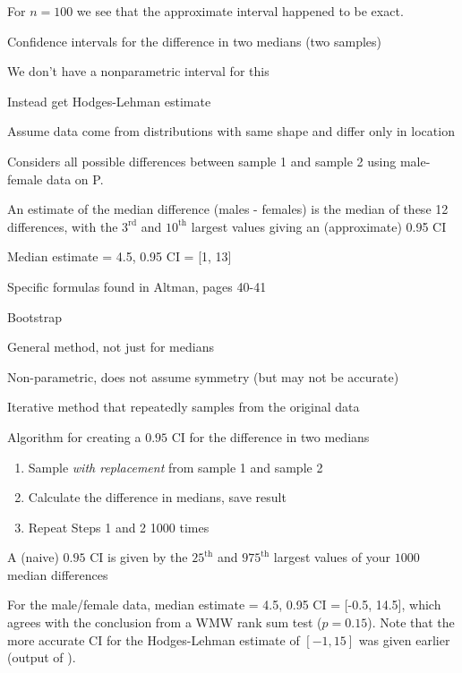 For $n=100$ we see that the approximate interval happened to be exact.
\ei
\item Confidence intervals for the difference in two medians (two samples)
\bi
\item We don't have a nonparametric interval for this
\item Instead get Hodges-Lehman estimate
\item Assume data come from distributions with same shape and differ only in location
\item Considers all possible differences between sample 1 and sample 2
  using male-female data on P.~\pageref{pg:nonpar-mf}
\item An estimate of the median difference (males - females) is the median of these 12 differences, with the $3^\textrm{rd}$ and $10^\textrm{th}$ largest values giving an (approximate) 0.95 CI
\item Median estimate = 4.5, 0.95 CI = [1, 13]
\item Specific formulas found in Altman, pages 40-41
\ei
\item Bootstrap 
\bi
\item General method, not just for medians
\item Non-parametric, does not assume symmetry (but may not be accurate)
\item Iterative method that repeatedly samples from the original data
\item Algorithm for creating a $0.95$ CI for the difference in two medians
\begin{enumerate}
\item Sample \textit{with replacement} from sample 1 and sample 2
\item Calculate the difference in medians, save result
\item Repeat Steps 1 and 2 1000 times
\end{enumerate}
\item A (naive) $0.95$ CI is given by the $25^\textrm{th}$ and $975^\textrm{th}$ largest values of your $1000$ median differences
\item For the male/female data, median estimate = 4.5, 0.95 CI = [-0.5, 14.5], which agrees with the conclusion from a WMW rank sum test ($p = 0.15$).  Note that the more accurate CI for the Hodges-Lehman estimate of $[-1, 15]$ was given earlier (output of ).
\ei
\ei
